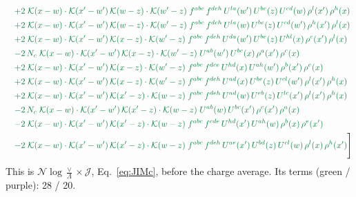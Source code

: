 \documentclass[10pt]{article}
\numberwithin{equation}{section}
\begin{document}
\begin{align}
&\quad{\color{JIM}+2\;\mathcal{K}(x-w)\cdot\mathcal{K}(x'-w')\,\mathcal{K}(w-z)\cdot\mathcal{K}(w'-z)\;f^{abc}\,f^{deh}\,U^{la}(w')\,U^{be}(z)\,U^{cd}(w)\,\rho^{l}(x')\,\rho^{h}(x)}\notag\\
&\quad{\color{JIM}+2\;\mathcal{K}(x-w)\cdot\mathcal{K}(x'-w')\,\mathcal{K}(w-z)\cdot\mathcal{K}(w'-z)\;f^{abc}\,f^{deh}\,U^{la}(w)\,U^{be}(z)\,U^{cd}(w')\,\rho^{h}(x')\,\rho^{l}(x)}\notag\\
&\quad{\color{JIM}+2\;\mathcal{K}(x-w)\cdot\mathcal{K}(x'-w')\,\mathcal{K}(x-z)\cdot\mathcal{K}(w'-z)\;f^{abc}\,f^{deh}\,U^{da}(w')\,U^{be}(z)\,U^{hl}(x)\,\rho^{c}(x')\,\rho^{l}(x)}\notag\\
&\quad{\color{JIM}-2\,N_c\;\mathcal{K}(x-w)\cdot\mathcal{K}(x'-w')\,\mathcal{K}(x-z)\cdot\mathcal{K}(w'-z)\;U^{ab}(w')\,U^{bc}(x)\,\rho^{a}(x')\,\rho^{c}(x)}\notag\\
&\quad{\color{JIM}+2\;\mathcal{K}(x-w)\cdot\mathcal{K}(x'-w')\,\mathcal{K}(x-z)\cdot\mathcal{K}(w'-z)\;f^{abc}\,f^{dce}\,U^{hd}(x)\,U^{ah}(w')\,\rho^{b}(x')\,\rho^{e}(x)}\notag\\
&\quad{\color{JIM}+2\;\mathcal{K}(x-w)\cdot\mathcal{K}(x'-w')\,\mathcal{K}(x-z)\cdot\mathcal{K}(w'-z)\;f^{abc}\,f^{deh}\,U^{ad}(x)\,U^{be}(z)\,U^{cl}(w')\,\rho^{l}(x')\,\rho^{h}(x)}\notag\\
&\quad{\color{JIM}+2\;\mathcal{K}(x-w)\cdot\mathcal{K}(x'-w')\,\mathcal{K}(x'-z)\cdot\mathcal{K}(w-z)\;f^{abc}\,f^{deh}\,U^{ad}(w)\,U^{eb}(z)\,U^{lc}(x')\,\rho^{l}(x')\,\rho^{h}(x)}\notag\\
&\quad{\color{JIM}-2\,N_c\;\mathcal{K}(x-w)\cdot\mathcal{K}(x'-w')\,\mathcal{K}(x'-z)\cdot\mathcal{K}(w-z)\;U^{ab}(w)\,U^{bc}(x')\,\rho^{c}(x')\,\rho^{a}(x)}\notag\\
&\quad{\color{JIM}-2\;\mathcal{K}(x-w)\cdot\mathcal{K}(x'-w')\,\mathcal{K}(x'-z)\cdot\mathcal{K}(w-z)\;f^{abc}\,f^{cde}\,U^{hd}(x')\,U^{ah}(w)\,\rho^{b}(x)\,\rho^{e}(x')}\notag\\
&\quad{\color{JIM}-2\;\mathcal{K}(x-w)\cdot\mathcal{K}(x'-w')\,\mathcal{K}(x'-z)\cdot\mathcal{K}(w-z)\;f^{abc}\,f^{deh}\,U^{ae}(x')\,U^{bd}(z)\,U^{cl}(w)\,\rho^{l}(x)\,\rho^{h}(x')}\Bigg]\label{eq:Jsum}
\end{align}
This is $\mathcal N\log\frac{\vee}{\Lambda}\times\mathcal J$, Eq.~\eqref{eq:JIMc}, before the charge average. Its terms (green / purple): 28 / 20.

\end{document}
